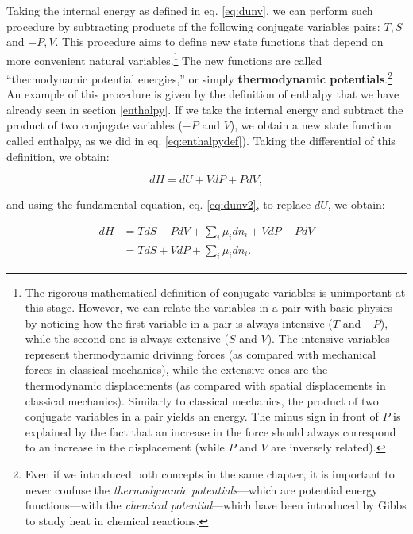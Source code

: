 \documentclass[
  9pt,
]{extbook}
\theoremstyle{definition}
\theoremstyle{definition}
\theoremstyle{definition}
\theoremstyle{remark}
\begin{document}
Taking the internal energy as defined in eq. \eqref{eq:dunv}, we can perform such procedure by subtracting products of the following conjugate variables pairs: \(T, S\) and \(-P, V\). This procedure aims to define new state functions that depend on more convenient natural variables.\footnote{The rigorous mathematical definition of conjugate variables is unimportant at this stage. However, we can relate the variables in a pair with basic physics by noticing how the first variable in a pair is always intensive (\(T\) and \(-P\)), while the second one is always extensive (\(S\) and \(V\)). The intensive variables represent thermodynamic drivinng forces (as compared with mechanical forces in classical mechanics), while the extensive ones are the thermodynamic displacements (as compared with spatial displacements in classical mechanics). Similarly to classical mechanics, the product of two conjugate variables in a pair yields an energy. The minus sign in front of \(P\) is explained by the fact that an increase in the force should always correspond to an increase in the displacement (while \(P\) and \(V\) are inversely related).} The new functions are called ``thermodynamic potential energies,'' or simply \textbf{thermodynamic potentials}.\footnote{Even if we introduced both concepts in the same chapter, it is important to never confuse the \emph{thermodynamic potentials}---which are potential energy functions---with the \emph{chemical potential}---which have been introduced by Gibbs to study heat in chemical reactions.} An example of this procedure is given by the definition of enthalpy that we have already seen in section \ref{enthalpy}. If we take the internal energy and subtract the product of two conjugate variables (\(-P\) and \(V\)), we obtain a new state function called enthalpy, as we did in eq. \eqref{eq:enthalpydef}). Taking the differential of this definition, we obtain:

\begin{equation}
dH = dU +VdP +PdV,
\label{eq:dhdef1}
\end{equation}

and using the fundamental equation, eq. \eqref{eq:dunv2}, to replace \(dU\), we obtain:

\begin{equation}
\begin{aligned}
dH & = TdS -PdV +\sum_i\mu_i dn_i +VdP +PdV  \\
   & = TdS +VdP +\sum_i\mu_i dn_i.
\end{aligned}
\label{eq:dhdef2}
\end{equation}
\end{document}
